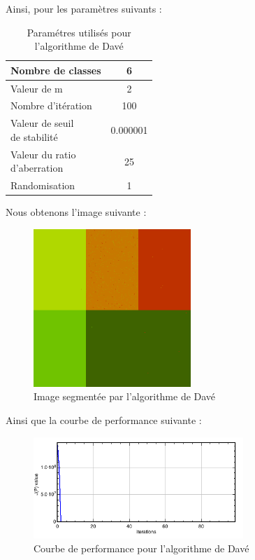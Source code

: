 \documentclass[a4paper,11pt]{article}
\begin{document}
Ainsi, pour les paramètres suivants : 

\begin{table}[H]
  \begin{center}
    \begin{tabular}{|l|c|}
      \hline
      Nombre de classes & 6 \\
      \hline
      Valeur de m & 2 \\
      \hline
      Nombre d'itération & 100 \\
      \hline
      \shortstack{ Valeur de seuil \\ de stabilité }  & 0.000001 \\
      \hline
      \shortstack{ Valeur du ratio \\ d'aberration }  & 25 \\
      \hline
      Randomisation & 1 \\
      \hline
    \end{tabular}
    \caption{Paramétres utilisés pour l'algorithme de Davé}
  \end{center}
\end{table}

Nous obtenons l'image suivante :

\begin{figure}[H]
\begin{center}
\includegraphics[width=225px]{../img/Dave.png}
\end{center}
\caption{Image segmentée par l'algorithme de Davé}
\end{figure}

Ainsi que la courbe de performance suivante :

\begin{figure}[H]
\begin{center}
\includegraphics[width=300px]{../img/Perf_Dave.png}
\end{center}
\caption{Courbe de performance pour l'algorithme de Davé}
\end{figure}
\end{document}
